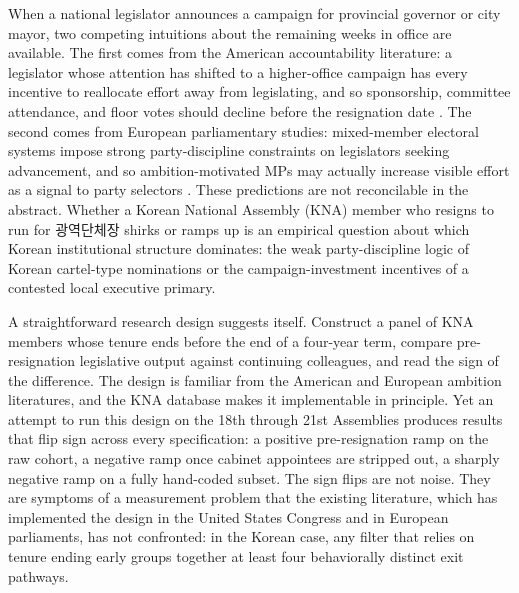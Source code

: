 \documentclass[11pt]{article}
\begin{document}
When a national legislator announces a campaign for provincial governor or city mayor, two competing intuitions about the remaining weeks in office are available. The first comes from the American accountability literature: a legislator whose attention has shifted to a higher-office campaign has every incentive to reallocate effort away from legislating, and so sponsorship, committee attendance, and floor votes should decline before the resignation date \citep{mayhew1974, besley1995}. The second comes from European parliamentary studies: mixed-member electoral systems impose strong party-discipline constraints on legislators seeking advancement, and so ambition-motivated MPs may actually increase visible effort as a signal to party selectors \citep{hansen2015}. These predictions are not reconcilable in the abstract. Whether a Korean National Assembly (KNA) member who resigns to run for 광역단체장 shirks or ramps up is an empirical question about which Korean institutional structure dominates: the weak party-discipline logic of Korean cartel-type nominations \citep{yoon2022} or the campaign-investment incentives of a contested local executive primary.

A straightforward research design suggests itself. Construct a panel of KNA members whose tenure ends before the end of a four-year term, compare pre-resignation legislative output against continuing colleagues, and read the sign of the difference. The design is familiar from the American and European ambition literatures, and the KNA database makes it implementable in principle. Yet an attempt to run this design on the 18th through 21st Assemblies produces results that flip sign across every specification: a positive pre-resignation ramp on the raw cohort, a negative ramp once cabinet appointees are stripped out, a sharply negative ramp on a fully hand-coded subset. The sign flips are not noise. They are symptoms of a measurement problem that the existing literature, which has implemented the design in the United States Congress and in European parliaments, has not confronted: in the Korean case, any filter that relies on tenure ending early groups together at least four behaviorally distinct exit pathways.
\end{document}
